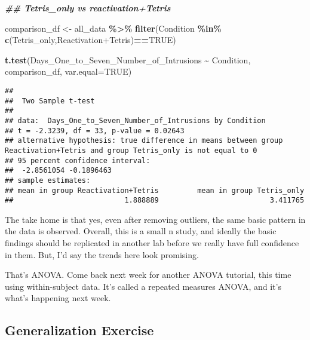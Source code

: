 \documentclass[
]{book}
\newenvironment{Shaded}{\begin{snugshade}}{\end{snugshade}}
\newcommand{\AttributeTok}[1]{\textcolor[rgb]{0.13,0.29,0.53}{#1}}
\newcommand{\ConstantTok}[1]{\textcolor[rgb]{0.56,0.35,0.01}{#1}}
\newcommand{\DocumentationTok}[1]{\textcolor[rgb]{0.56,0.35,0.01}{\textbf{\textit{#1}}}}
\newcommand{\FunctionTok}[1]{\textcolor[rgb]{0.13,0.29,0.53}{\textbf{#1}}}
\newcommand{\NormalTok}[1]{#1}
\newcommand{\OtherTok}[1]{\textcolor[rgb]{0.56,0.35,0.01}{#1}}
\newcommand{\SpecialCharTok}[1]{\textcolor[rgb]{0.81,0.36,0.00}{\textbf{#1}}}
\newcommand{\StringTok}[1]{\textcolor[rgb]{0.31,0.60,0.02}{#1}}
\begin{document}
\begin{Shaded}
\begin{Highlighting}[]
\DocumentationTok{\#\# Tetris\_only vs reactivation+Tetris}

\NormalTok{comparison\_df }\OtherTok{\textless{}{-}}\NormalTok{ all\_data }\SpecialCharTok{\%\textgreater{}\%} 
                  \FunctionTok{filter}\NormalTok{(Condition }\SpecialCharTok{\%in\%} \FunctionTok{c}\NormalTok{(}\StringTok{\textquotesingle{}Tetris\_only\textquotesingle{}}\NormalTok{,}\StringTok{\textquotesingle{}Reactivation+Tetris\textquotesingle{}}\NormalTok{)}\SpecialCharTok{==}\ConstantTok{TRUE}\NormalTok{)}
                        
\FunctionTok{t.test}\NormalTok{(Days\_One\_to\_Seven\_Number\_of\_Intrusions }\SpecialCharTok{\textasciitilde{}}\NormalTok{ Condition, }
\NormalTok{       comparison\_df,}
       \AttributeTok{var.equal=}\ConstantTok{TRUE}\NormalTok{)}
\end{Highlighting}
\end{Shaded}

\begin{verbatim}
## 
##  Two Sample t-test
## 
## data:  Days_One_to_Seven_Number_of_Intrusions by Condition
## t = -2.3239, df = 33, p-value = 0.02643
## alternative hypothesis: true difference in means between group Reactivation+Tetris and group Tetris_only is not equal to 0
## 95 percent confidence interval:
##  -2.8561054 -0.1896463
## sample estimates:
## mean in group Reactivation+Tetris         mean in group Tetris_only 
##                          1.888889                          3.411765
\end{verbatim}

The take home is that yes, even after removing outliers, the same basic pattern in the data is observed. Overall, this is a small n study, and ideally the basic findings should be replicated in another lab before we really have full confidence in them. But, I'd say the trends here look promising.

That's ANOVA. Come back next week for another ANOVA tutorial, this time using within-subject data. It's called a repeated measures ANOVA, and it's what's happening next week.

\hypertarget{generalization-exercise-7}{%
\subsection{Generalization Exercise}\label{generalization-exercise-7}}
\end{document}
